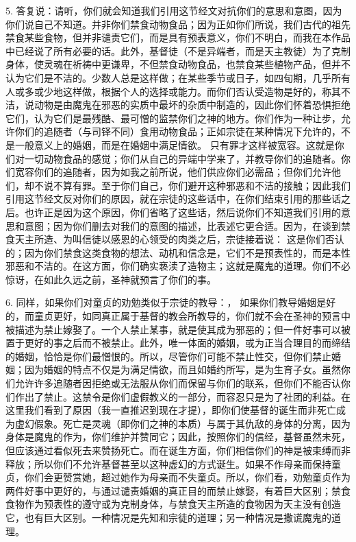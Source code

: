5. 答复说：请听，你们就会知道我们引用这节经文对抗你们的意思和意图，因为你们说自己不知道。并非你们禁食动物食品；因为正如你们所说，我们古代的祖先禁食某些食物，但并非谴责它们，而是具有预表意义，你们不明白，而我在本作品中已经说了所有必要的话。此外，基督徒（不是异端者，而是天主教徒）为了克制身体，使灵魂在祈祷中更谦卑，不但禁食动物食品，也禁食某些植物产品，但并不认为它们是不洁的。少数人总是这样做；在某些季节或日子，如四旬期，几乎所有人或多或少地这样做，根据个人的选择或能力。而你们否认受造物是好的，称其不洁，说动物是由魔鬼在邪恶的实质中最坏的杂质中制造的，因此你们怀着恐惧拒绝它们，认为它们是最残酷、最可憎的监禁你们之神的地方。你们作为一种让步，允许你们的追随者（与司铎不同）食用动物食品；正如宗徒在某种情况下允许的，不是一般意义上的婚姻，而是在婚姻中满足情欲。 只有罪才这样被宽容。这就是你们对一切动物食品的感觉；你们从自己的异端中学来了，并教导你们的追随者。你们宽容你们的追随者，因为如我之前所说，他们供应你们必需品；但你们允许他们，却不说不算有罪。至于你们自己，你们避开这种邪恶和不洁的接触；因此我们引用这节经文反对你们的原因，就在宗徒的这些话中，在你们结束引用的那些话之后。也许正是因为这个原因，你们省略了这些话，然后说你们不知道我们引用的意思和意图；因为你们删去对我们的意图的描述，比表述它更合适。因为，在谈到禁食天主所造、为叫信徒以感恩的心领受的肉类之后，宗徒接着说： 这是你们否认的；因为你们禁食这类食物的想法、动机和信念是，它们不是预表性的，而是本性邪恶和不洁的。在这方面，你们确实亵渎了造物主；这就是魔鬼的道理。你们不必惊讶，在如此久远之前，圣神就预言了你们的事。\par

6. 同样，如果你们对童贞的劝勉类似于宗徒的教导：， 如果你们教导婚姻是好的，而童贞更好，如同真正属于基督的教会所教导的，你们就不会在圣神的预言中被描述为禁止嫁娶了。一个人禁止某事，就是使其成为邪恶的；但一件好事可以被置于更好的事之后而不被禁止。此外，唯一体面的婚姻，或为正当合理目的而缔结的婚姻，恰恰是你们最憎恨的。所以，尽管你们可能不禁止性交，但你们禁止婚姻；因为婚姻的特点不仅是为满足情欲，而且如婚约所写，是为生育子女。虽然你们允许许多追随者因拒绝或无法服从你们而保留与你们的联系，但你们不能否认你们作出了禁止。这禁令是你们虚假教义的一部分，而容忍只是为了社团的利益。在这里我们看到了原因（我一直推迟到现在才提），即你们使基督的诞生而非死亡成为虚幻假象。死亡是灵魂（即你们之神的本质）与属于其仇敌的身体的分离，因为身体是魔鬼的作为，你们维护并赞同它；因此，按照你们的信经，基督虽然未死，但应该通过看似死去来赞扬死亡。而在诞生方面，你们相信你们的神是被束缚而非释放；所以你们不允许基督甚至以这种虚幻的方式诞生。如果不作母亲而保持童贞，你们会更赞赏她，超过她作为母亲而不失童贞。所以，你们看，劝勉童贞作为两件好事中更好的，与通过谴责婚姻的真正目的而禁止嫁娶，有着巨大区别；禁食食物作为预表性的遵守或为克制身体，与禁食天主所造的食物因为天主没有创造它，也有巨大区别。一种情况是先知和宗徒的道理；另一种情况是撒谎魔鬼的道理。\par

